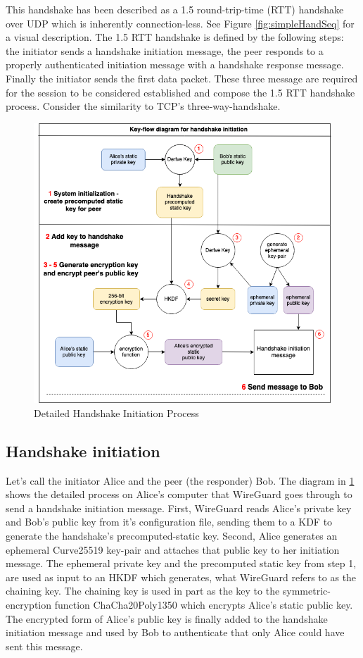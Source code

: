 \documentclass [11pt, proquest] {uwthesis}[2020/02/24]
\begin{document}
This handshake has been described as a 1.5 round-trip-time (RTT) handshake over UDP which is inherently connection-less. See Figure \ref{fig:simpleHandSeq} for a visual description.  The 1.5 RTT handshake is defined by the following steps: the initiator sends a handshake initiation message, the peer responds to a properly authenticated initiation message with a handshake response message. Finally the initiator sends the first data packet. These three message are required for the session to be considered established and compose the 1.5 RTT handshake process. Consider the similarity to TCP's three-way-handshake.
\begin{figure}[H]
\includegraphics[width=16cm]{paper/images/key-flow-wg.png}
\caption{Detailed Handshake Initiation Process}
\label{fig:keyflow}
\end{figure}
\subsection{Handshake initiation}
\label{handinit}
Let's call the initiator Alice and the peer (the responder) Bob.
The diagram in \ref{fig:keyflow} shows the detailed process on Alice's computer that WireGuard goes through to send a handshake initiation message. First, WireGuard reads Alice's private key and Bob's public key from it's configuration file, sending them to a KDF to generate the handshake's precomputed-static key. Second, Alice generates an ephemeral Curve25519 key-pair and attaches that public key to her initiation message. The ephemeral private key and the precomputed static key from step 1, are used as input to an HKDF which generates, what WireGuard refers to as the chaining key. The chaining key is used in part as the key to the symmetric-encryption function ChaCha20Poly1350 which encrypts Alice's static public key. The encrypted form of Alice's public key is finally added to the handshake initiation message and used by Bob to authenticate that only Alice could have sent this message.
\end{document}
